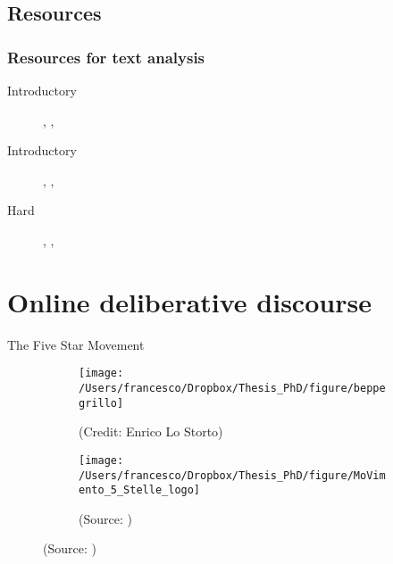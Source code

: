 \documentclass[serif, aspectratio=169]{beamer}
\newcommand{\customcite}[1]{\citeauthor{#1}, \citetitle{#1}, \citeyear{#1}}
\begin{document}
\subsection{Resources}

\begin{frame}
\frametitle{Resources for text analysis}

\begin{description}

\item [Introductory] \customcite{jockers_text_2014}

\item [Introductory] \customcite{bird_natural_2009}

\item [Hard] \customcite{manning_introduction_2008}

\end{description}

\end{frame}

\fi

\section{Online deliberative discourse}


\begin{frame}
{The Five Star Movement}
\begin{figure}
\begin{subfigure}[b]{.45\linewidth}
\centering
   \texttt{[image: /Users/francesco/Dropbox/Thesis\_PhD/figure/beppegrillo]}
   \caption{(Credit: Enrico Lo Storto)}
   \end{subfigure}\hfill
   \begin{subfigure}[b]{.45\linewidth}
   \centering
   \texttt{[image: /Users/francesco/Dropbox/Thesis\_PhD/figure/MoVimento\_5\_Stelle\_logo]}
   \caption{(Source: \cite{_logo_2013})}
   \end{subfigure}
\end{figure}


\end{frame}
\end{document}
